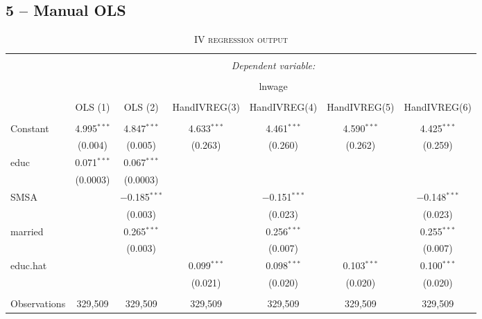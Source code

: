 \documentclass[a4paper]{article}
\begin{document}
\subsection{5 -- Manual OLS}

\begin{table}[!htbp] \centering 
\begin{adjustwidth}{0.cm}{-0cm}
\begin{threeparttable}
\small
\captionsetup{font=small, justification=raggedright,singlelinecheck=false}
\caption{\textsc{IV regression output}}
\centering 
  \label{}
\small 
\begin{tabular}{@{\extracolsep{-5pt}}lcccccc} 
\\[-5.8ex]\hline 
\hline \\[-1.8ex] 
 & \multicolumn{6}{c}{\textit{Dependent variable:}} \\ 
\cline{2-7} 
\\[-1.8ex] & \multicolumn{6}{c}{lnwage} \\ 
\\[-1.8ex] & OLS (1) & OLS (2) & HandIVREG(3) & HandIVREG(4) & HandIVREG(5) & HandIVREG(6)\\ 
\hline \\[-1.8ex] 
 Constant & 4.995$^{***}$ & 4.847$^{***}$ & 4.633$^{***}$ & 4.461$^{***}$ & 4.590$^{***}$ & 4.425$^{***}$ \\ 
  & (0.004) & (0.005) & (0.263) & (0.260) & (0.262) & (0.259) \\ 
  educ & 0.071$^{***}$ & 0.067$^{***}$ &  &  &  &  \\ 
  & (0.0003) & (0.0003) &  &  &  &  \\ 
  SMSA &  & $-$0.185$^{***}$ &  & $-$0.151$^{***}$ &  & $-$0.148$^{***}$ \\ 
  &  & (0.003) &  & (0.023) &  & (0.023) \\ 
  married &  & 0.265$^{***}$ &  & 0.256$^{***}$ &  & 0.255$^{***}$ \\ 
  &  & (0.003) &  & (0.007) &  & (0.007) \\ 
  educ.hat &  &  & 0.099$^{***}$ & 0.098$^{***}$ & 0.103$^{***}$ & 0.100$^{***}$ \\ 
  &  &  & (0.021) & (0.020) & (0.020) & (0.020) \\ 
 \hline \\[-1.8ex] 
Observations & 329,509 & 329,509 & 329,509 & 329,509 & 329,509 & 329,509 \\ 

\end{tabular}
\end{threeparttable}
\end{adjustwidth}
\end{table}
\end{document}
